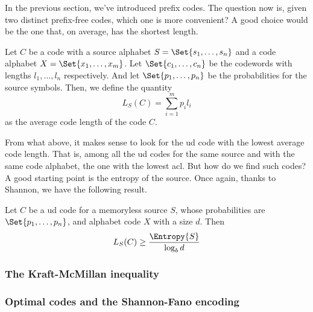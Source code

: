 \documentclass{subfiles}
\begin{document}
    In the previous section, we've introduced prefix codes. 
    The question now is, given two distinct prefix-free codes,
        which one is more convenient?
        A good choice would be the one that, on average,
        has the shortest length.

    \begin{definition*}
        Let \(C\) be a code with a source alphabet \(S = \Set{s_{1}, \ldots, s_{n}}\)
        and a code alphabet \(X = \Set{x_{1}, \ldots, x_{m}}\). 
        Let \(\Set{c_{1}, \ldots, c_{n}}\) be the codewords with lengths 
        \(l_{1}, \ldots, l_{n}\) respectively. And let \(\Set{p_{1}, \ldots, p_{n}}\)
        be the probabilities for the source symbols. 
            Then, we define the quantity
            \[
                L_{S}(C) = \sum_{i = 1}^{m}{p_{i} l_{i}}
            \]
            as the average code length of the code \(C\).
    \end{definition*}
    From what above, it makes sense to look for the \gls{ud} code with the lowest average code length.
    That is, among all the \gls{ud} codes for the same source and with the same code alphabet,
    the one with the lowest \gls{acl}. But how do we find such codes?
    A good starting point is the entropy of the source. Once again, 
    thanks to Shannon, we have the following result.
    \begin{theorem*}[Shannon]
        Let \(C\) be a \gls{ud} code for a memoryless source \(S\),
        whose probabilities are \(\Set{p_{1}, \ldots, p_{n}}\),
        and alphabet code \(X\) with a size \(d\). 
        Then 
        \[
            L_{S}(C) \ge \frac{\Entropy{S}}{\log_{b}{d}}
        \]
    \end{theorem*}

    \subsubsection{The Kraft-McMillan inequality}
    

    \subsubsection{Optimal codes and the Shannon-Fano encoding}
    
\end{document}
